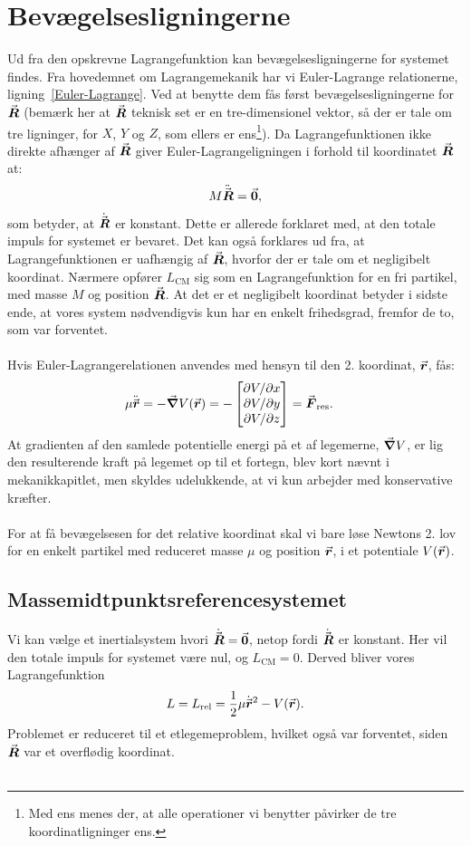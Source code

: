 \section{Bevægelsesligningerne}
Ud fra den opskrevne Lagrangefunktion kan bevægelsesligningerne for systemet findes. Fra hovedemnet om Lagrangemekanik har vi Euler-Lagrange relationerne, ligning~\eqref{Euler-Lagrange}. Ved at benytte dem fås først bevægelsesligningerne for ${\vec{\boldsymbol{R}}}$ (bemærk her at ${\vec{\boldsymbol{R}}}$ teknisk set er en tre-dimensionel vektor, så der er tale om tre ligninger, for $X$, $Y$ og $Z$, som ellers er ens\footnote{Med ens menes der, at alle operationer vi benytter påvirker de tre koordinatligninger ens.}). Da Lagrangefunktionen ikke direkte afhænger af ${\vec{\boldsymbol{R}}}$ giver Euler-Lagrangeligningen i forhold til koordinatet ${\vec{\boldsymbol{R}}}$ at:
\begin{align}
	M\ddot{{\vec{\boldsymbol{R}}}} = {\vec{\boldsymbol{0}}},
\end{align}
som betyder, at $\dot{{\vec{\boldsymbol{R}}}}$ er konstant. Dette er allerede forklaret med, at den totale impuls for systemet er bevaret. Det kan også forklares ud fra, at Lagrangefunktionen er uafhængig af ${\vec{\boldsymbol{R}}}$, hvorfor der er tale om et negligibelt koordinat. Nærmere opfører $L_\text{CM}$ sig som en Lagrangefunktion for en fri partikel, med masse $M$ og position ${\vec{\boldsymbol{R}}}$. At det er et negligibelt koordinat betyder i sidste ende, at vores system nødvendigvis kun har en enkelt frihedsgrad, fremfor de to, som var forventet. \\ \\
%
%
Hvis Euler-Lagrangerelationen anvendes med hensyn til den 2. koordinat, ${\vec{\boldsymbol{r}}}$, fås:
\begin{align}
	\mu \ddot{{\vec{\boldsymbol{r}}}} &= - {\vec{\boldsymbol{\nabla}}} V({\vec{\boldsymbol{r}}}) = - \begin{bmatrix} \partial V / \partial x \\ \partial V / \partial y \\ \partial V / \partial z \end{bmatrix} = {\vec{\boldsymbol{F}}}_{\text{res}}.
\end{align}
At gradienten af den samlede potentielle energi på et af legemerne, ${\vec{\boldsymbol{\nabla}}} V$, er lig den resulterende kraft på legemet op til et fortegn, blev kort nævnt i mekanikkapitlet, men skyldes udelukkende, at vi kun arbejder med konservative kræfter. \\ \\
%
%
For at få bevægelsesen for det relative koordinat skal vi bare løse Newtons 2. lov for en enkelt partikel med reduceret masse $\mu$ og position ${\vec{\boldsymbol{r}}}$, i et potentiale $V({\vec{\boldsymbol{r}}})$.
%
%
\subsection*{Massemidtpunktsreferencesystemet}
Vi kan vælge et inertialsystem hvori $\dot{{\vec{\boldsymbol{R}}}} = {\vec{\boldsymbol{0}}}$, netop fordi $\dot{{\vec{\boldsymbol{R}}}}$ er konstant. Her vil den totale impuls for systemet være nul, og $L_\text{CM} = 0$. Derved bliver vores Lagrangefunktion
\begin{align}
	L = L_\text{rel} = \frac{1}{2} \mu \dot{{\vec{\boldsymbol{r}}}}^2 - V({\vec{\boldsymbol{r}}}).
\end{align}
Problemet er reduceret til et etlegemeproblem, hvilket også var forventet, siden ${\vec{\boldsymbol{R}}}$ var et overflødig koordinat. \\ \\ %

